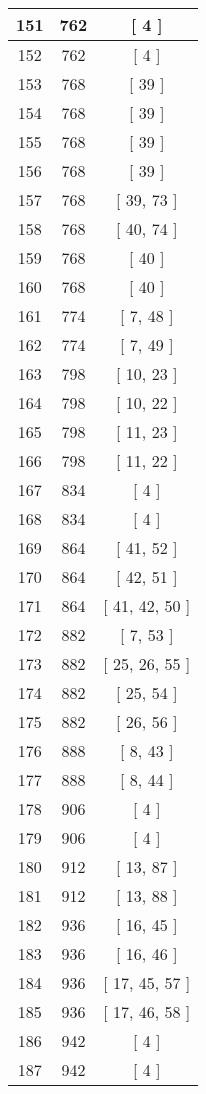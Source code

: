 \begin{center}
\begin{longtable}[H]{|| c c c ||}
151 & 762 & [ 4 ]
\\\hline
152 & 762 & [ 4 ]
\\\hline
153 & 768 & [ 39 ]
\\\hline
154 & 768 & [ 39 ]
\\\hline
155 & 768 & [ 39 ]
\\\hline
156 & 768 & [ 39 ]
\\\hline
157 & 768 & [ 39, 73 ]
\\\hline
158 & 768 & [ 40, 74 ]
\\\hline
159 & 768 & [ 40 ]
\\\hline
160 & 768 & [ 40 ]
\\\hline
161 & 774 & [ 7, 48 ]
\\\hline
162 & 774 & [ 7, 49 ]
\\\hline
163 & 798 & [ 10, 23 ]
\\\hline
164 & 798 & [ 10, 22 ]
\\\hline
165 & 798 & [ 11, 23 ]
\\\hline
166 & 798 & [ 11, 22 ]
\\\hline
167 & 834 & [ 4 ]
\\\hline
168 & 834 & [ 4 ]
\\\hline
169 & 864 & [ 41, 52 ]
\\\hline
170 & 864 & [ 42, 51 ]
\\\hline
171 & 864 & [ 41, 42, 50 ]
\\\hline
172 & 882 & [ 7, 53 ]
\\\hline
173 & 882 & [ 25, 26, 55 ]
\\\hline
174 & 882 & [ 25, 54 ]
\\\hline
175 & 882 & [ 26, 56 ]
\\\hline
176 & 888 & [ 8, 43 ]
\\\hline
177 & 888 & [ 8, 44 ]
\\\hline
178 & 906 & [ 4 ]
\\\hline
179 & 906 & [ 4 ]
\\\hline
180 & 912 & [ 13, 87 ]
\\\hline
181 & 912 & [ 13, 88 ]
\\\hline
182 & 936 & [ 16, 45 ]
\\\hline
183 & 936 & [ 16, 46 ]
\\\hline
184 & 936 & [ 17, 45, 57 ]
\\\hline
185 & 936 & [ 17, 46, 58 ]
\\\hline
186 & 942 & [ 4 ]
\\\hline
187 & 942 & [ 4 ]
\\\hline

\end{longtable}
\end{center}
